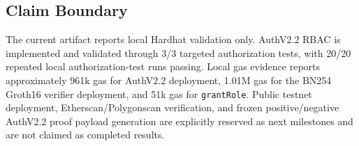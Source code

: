 \subsection{Claim Boundary}

The current artifact reports local Hardhat validation only. AuthV2.2 RBAC is implemented and validated through 3/3 targeted authorization tests, with 20/20 repeated local authorization-test runs passing. Local gas evidence reports approximately 961k gas for AuthV2.2 deployment, 1.01M gas for the BN254 Groth16 verifier deployment, and 51k gas for \texttt{grantRole}. Public testnet deployment, Etherscan/Polygonscan verification, and frozen positive/negative AuthV2.2 proof payload generation are explicitly reserved as next milestones and are not claimed as completed results.
